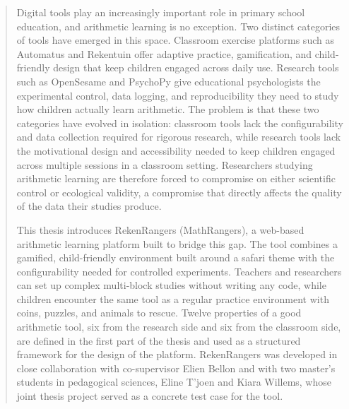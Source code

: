 \documentclass[master=ecws,english]{kulemt}
\begin{document}
\begin{abstract}
Digital tools play an increasingly important role in primary school education, and arithmetic learning is no exception. Two distinct categories of tools have emerged in this space. Classroom exercise platforms such as Automatus and Rekentuin offer adaptive practice, gamification, and child-friendly design that keep children engaged across daily use. Research tools such as OpenSesame and PsychoPy give educational psychologists the experimental control, data logging, and reproducibility they need to study how children actually learn arithmetic. The problem is that these two categories have evolved in isolation: classroom tools lack the configurability and data collection required for rigorous research, while research tools lack the motivational design and accessibility needed to keep children engaged across multiple sessions in a classroom setting. Researchers studying arithmetic learning are therefore forced to compromise on either scientific control or ecological validity, a compromise that directly affects the quality of the data their studies produce.

This thesis introduces RekenRangers (MathRangers), a web-based arithmetic learning platform built to bridge this gap. The tool combines a gamified, child-friendly environment built around a safari theme with the configurability needed for controlled experiments. Teachers and researchers can set up complex multi-block studies without writing any code, while children encounter the same tool as a regular practice environment with coins, puzzles, and animals to rescue. Twelve properties of a good arithmetic tool, six from the research side and six from the classroom side, are defined in the first part of the thesis and used as a structured framework for the design of the platform. RekenRangers was developed in close collaboration with co-supervisor Elien Bellon and with two master's students in pedagogical sciences, Eline T'joen and Kiara Willems, whose joint thesis project served as a concrete test case for the tool.


\end{abstract}
\end{document}
